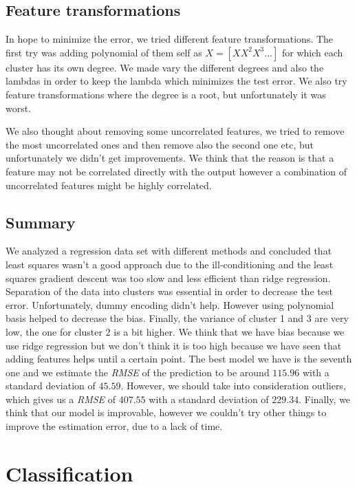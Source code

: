 \documentclass{article} %
\begin{document}
\subsection{Feature transformations}

In hope to minimize the error, we tried different feature transformations. The first try was adding polynomial of them self as $X = [X X^2 X^3 ...]$ for which each cluster has its own degree. We made vary the different degrees and also the lambdas in order to keep the lambda which minimizes the test error. We also try feature transformations where the degree is a root, but unfortunately it was worst.

We also thought about removing some uncorrelated features, we tried to remove the most uncorrelated ones and then remove also the second one etc, but unfortunately we didn't get improvements. We think that the reason is that a feature may not be correlated directly with the output however a combination of uncorrelated features might be highly correlated. 

\subsection{Summary}

We analyzed a regression data set with different methods and concluded that least squares wasn't a good approach due to the ill-conditioning and the least squares gradient descent was too slow and less efficient than ridge regression. Separation of the data into clusters was essential in order to decrease the test error. Unfortunately, dummy encoding didn't help. However using polynomial basis helped to decrease the bias. Finally, the variance of cluster 1 and 3 are very low, the one for cluster 2 is a bit higher. We think that we have bias because we use ridge regression but we don't think it is too high because we have seen that adding features helps until a certain point. The best model we have is the seventh one and we estimate the \textit{RMSE} of the prediction to be around $115.96$ with a standard deviation of $45.59$. However, we should take into consideration outliers, which gives us a \textit{RMSE} of $407.55$ with a standard deviation of $229.34$. Finally, we think that our model is improvable, however we couldn't try other things to improve the estimation error, due to a lack of time.

\section{Classification}
\end{document}
